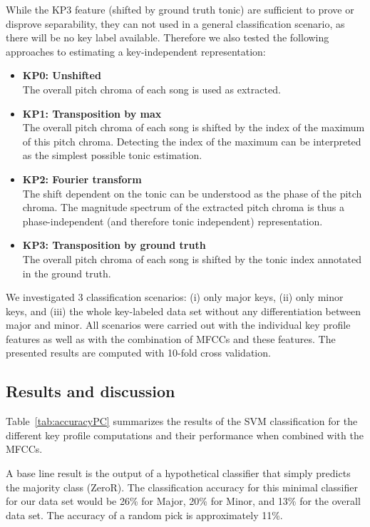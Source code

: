 \documentclass{article}
\begin{document}
While the KP3 feature (shifted by ground truth tonic) are sufficient to prove or disprove separability, they can not used in a general classification scenario, as there will be no key label available. Therefore we also tested the following approaches to estimating a key-independent representation:
\begin{itemize}
    \item   \textbf{KP0: Unshifted}\\
        The overall pitch chroma of each song is used as extracted.
    \item   \textbf{KP1: Transposition by max}\\
        The overall pitch chroma of each song is shifted by the index of the maximum of this pitch chroma. Detecting the index of the maximum can be interpreted as the simplest possible tonic estimation.
    \item   \textbf{KP2: Fourier transform}\\
        The shift dependent on the tonic can be understood as the phase of the pitch chroma. The magnitude spectrum of the extracted pitch chroma is thus a phase-independent (and therefore tonic independent) representation. %
    \item   \textbf{KP3: Transposition by ground truth}\\
        The overall pitch chroma of each song is shifted by the tonic index annotated in the ground truth.
\end{itemize}

We investigated 3 classification scenarios: (i) only major keys, (ii) only minor keys, and (iii) the whole key-labeled data set without any differentiation between major and minor. All scenarios were carried out with the individual key profile features as well as with the combination of MFCCs and these features. The presented results are computed with 10-fold cross validation.

\subsection{Results and discussion}
Table~\ref{tab:accuracyPC} summarizes the results of the SVM classification for the different key profile computations and their performance when combined with the MFCCs. 

A base line result is the output of a hypothetical classifier that simply predicts the majority class (ZeroR). The classification accuracy for this minimal classifier for our data set would be 26\% for Major, 20\% for Minor, and 13\% for the overall data set. The accuracy of a random pick is approximately 11\%.
\end{document}

